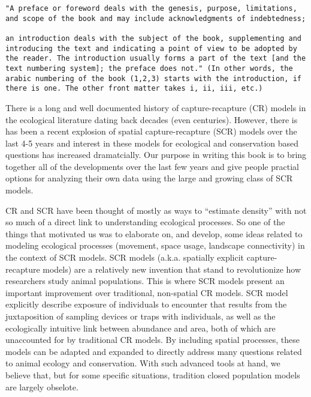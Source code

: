 \begin{verbatim}
"A preface or foreword deals with the genesis, purpose, limitations,
and scope of the book and may include acknowledgments of indebtedness;

an introduction deals with the subject of the book, supplementing and
introducing the text and indicating a point of view to be adopted by
the reader. The introduction usually forms a part of the text [and the
text numbering system]; the preface does not." (In other words, the
arabic numbering of the book (1,2,3) starts with the introduction, if
there is one. The other front matter takes i, ii, iii, etc.)
\end{verbatim}

\begin{comment}
RS:
According to what we discussed a few days ago, the 4 big blocks of the Preface should be
1. Why are we writing this book?
2. What are the themes?
3. Software/computing/modeling - something about the practical aspects
4. Organization of the book
I tried commenting on the below material referring to this overall orgainzation we agreed on.
\end{comment}



There is a long and well documented history of capture-recapture (CR) models in the
ecological literature dating back decades (even centuries).  However, there is has been 
a recent explosion of spatial capture-recapture (SCR) models over the last 4-5 years and 
interest in these models for ecological and conservation based questions has increased
dramatcially.  Our purpose  in writing this
book is to bring together all of the developments over the last few
years and give people practial options for analyzing their own data
using the large and growing class of SCR models.  

CR and SCR have been thought of mostly as ways to ``estimate density''
with not so much of a direct link to understanding ecological
processes. So one of the things that motivated us was to
elaborate on, and develop, some ideas related to modeling ecological
processes (movement, space usage, landscape connectivity) in the
context of SCR models.  SCR models (a.k.a.
spatially explicit capture-recapture models) are a relatively new invention that
stand to revolutionize how researchers study animal populations.  
This is where  SCR models present
an important improvement over traditional, non-spatial CR models.
SCR model explicitly describe exposure of individuals to encounter
that results from the juxtaposition of sampling devices or traps with
individuals, as well as the ecologically intuitive link between
abundance and area, both of which are unaccounted for by traditional CR
models. By including spatial processes, these models can be adapted and
expanded to directly address many questions related to animal ecology
and conservation. With such advanced tools at hand, we believe that,
but for some specific situations, tradition closed population models
are largely obselote. 

